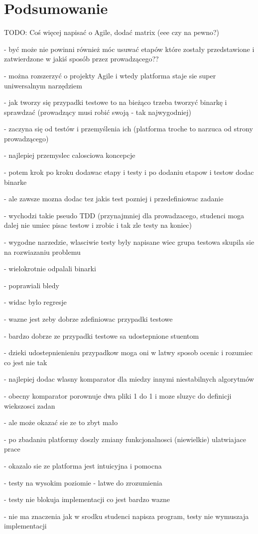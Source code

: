 \section{Podsumowanie}
\label{research_summary}

TODO: Coś więcej napisać o Agile, dodać matrix (eee czy na pewno?)

- być może nie powinni również móc usuwać etapów które zostały przedstawione i zatwierdzone w jakiś sposób przez prowadzącego??

- można rozszerzyć o projekty Agile i wtedy platforma staje sie super uniwersalnym narzędziem

- jak tworzy się przypadki testowe to na bieżąco trzeba tworzyć binarkę i sprawdzać (prowadzący musi robić swoją - tak najwygodniej)

- zaczyna się od testów i przemyślenia ich (platforma troche to narzuca od strony prowadzącego)

- najlepiej przemyslec calosciowa koncepcje

- potem krok po kroku dodawac etapy i testy i po dodaniu etapow i testow dodac binarke

- ale zawsze mozna dodac tez jakis test pozniej i przedefiniowac zadanie

- wychodzi takie pseudo TDD (przynajmniej dla prowadzacego, studenci moga dalej nie umiec pisac testow i zrobic i tak zle testy na koniec)

- wygodne narzedzie, wlasciwie testy byly napisane wiec grupa testowa skupila sie na rozwiazaniu problemu

- wielokrotnie odpalali binarki

- poprawiali bledy

- widac bylo regresje

- wazne jest zeby dobrze zdefiniowac przypadki testowe

- bardzo dobrze ze przypadki testowe sa udostepnione stuentom

- dzieki udostepnienieniu przypadkow moga oni w latwy sposob ocenic i rozumiec co jest nie tak

- najlepiej dodac wlasny komparator dla miedzy innymi niestabilnych algorytmów

- obecny komparator porownuje dwa pliki 1 do 1 i moze sluzyc do definicji wiekszosci zadan

- ale może okazać sie ze to zbyt mało

- po zbadaniu platformy doszly zmiany funkcjonalnosci (niewielkie) ulatwiajace prace

- okazalo sie ze platforma jest intuicyjna i pomocna

- testy na wysokim poziomie - latwe do zrozumienia

- testy nie blokuja implementacji co jest bardzo wazne

- nie ma znaczenia jak w srodku studenci napisza program, testy nie wymuszaja implementacji



